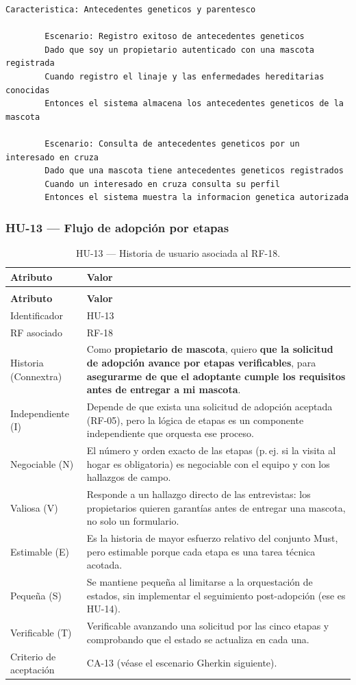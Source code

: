 \documentclass[journal,onecolumn]{IEEEtran}
\makeatletter
\newenvironment{atributos}[2]{%
	\small
	\begin{longtable}{@{}>{\raggedright\arraybackslash}p{4.2cm} >{\raggedright\arraybackslash}p{11.2cm}@{}}
		\caption{#2}\label{tab:#1}\\
		\toprule
		\textbf{Atributo} & \textbf{Valor} \\
		\midrule
		\endfirsthead
		\multicolumn{2}{@{}l}{\small\itshape (continuación)}\\
		\toprule
		\textbf{Atributo} & \textbf{Valor} \\
		\midrule
		\endhead
		\bottomrule
		\endlastfoot
	}{%
	\end{longtable}
	\normalsize
}
\makeatother
\begin{document}
	\begin{lstlisting}[style=gherkin,caption={CA-12 --- Escenario de aceptación de la historia HU-12.},label={lst:ca12}]
		Caracteristica: Antecedentes geneticos y parentesco
		
		Escenario: Registro exitoso de antecedentes geneticos
		Dado que soy un propietario autenticado con una mascota registrada
		Cuando registro el linaje y las enfermedades hereditarias conocidas
		Entonces el sistema almacena los antecedentes geneticos de la mascota
		
		Escenario: Consulta de antecedentes geneticos por un interesado en cruza
		Dado que una mascota tiene antecedentes geneticos registrados
		Cuando un interesado en cruza consulta su perfil
		Entonces el sistema muestra la informacion genetica autorizada
	\end{lstlisting}
	
	\subsubsection{HU-13 --- Flujo de adopción por etapas}
	
	\begin{atributos}{HU-13}{HU-13 --- Historia de usuario asociada al RF-18.}
		Identificador & HU-13 \\
		RF asociado & RF-18 \\
		Historia (Connextra) & Como \textbf{propietario de mascota}, quiero \textbf{que la solicitud de adopción avance por etapas verificables}, para \textbf{asegurarme de que el adoptante cumple los requisitos antes de entregar a mi mascota}. \\
		Independiente (I) & Depende de que exista una solicitud de adopción aceptada (RF-05), pero la lógica de etapas es un componente independiente que orquesta ese proceso. \\
		Negociable (N) & El número y orden exacto de las etapas (p.\,ej. si la visita al hogar es obligatoria) es negociable con el equipo y con los hallazgos de campo. \\
		Valiosa (V) & Responde a un hallazgo directo de las entrevistas: los propietarios quieren garantías antes de entregar una mascota, no solo un formulario. \\
		Estimable (E) & Es la historia de mayor esfuerzo relativo del conjunto Must, pero estimable porque cada etapa es una tarea técnica acotada. \\
		Pequeña (S) & Se mantiene pequeña al limitarse a la orquestación de estados, sin implementar el seguimiento post-adopción (ese es HU-14). \\
		Verificable (T) & Verificable avanzando una solicitud por las cinco etapas y comprobando que el estado se actualiza en cada una. \\
		Criterio de aceptación & CA-13 (véase el escenario Gherkin siguiente). \\
	\end{atributos}
	
\end{document}
